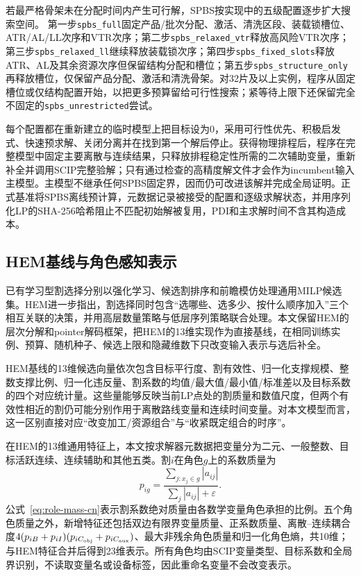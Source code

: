 \documentclass[final,5p,times,twocolumn]{elsarticle}
\begin{document}
若最严格骨架未在分配时间内产生可行解，SPBS按实现中的五级配置逐步扩大搜索空间。
第一步\texttt{spbs\_full}固定产品/批次分配、激活、清洗区段、装载锁槽位、ATR/AL/LL次序和VTR次序；第二步\texttt{spbs\_relaxed\_vtr}释放高风险VTR次序；第三步\texttt{spbs\_relaxed\_ll}继续释放装载锁次序；第四步\texttt{spbs\_fixed\_slots}释放ATR、AL及其余资源次序但保留结构分配和槽位；第五步\texttt{spbs\_structure\_only}再释放槽位，仅保留产品分配、激活和清洗骨架。对32片及以上实例，程序从固定槽位或仅结构配置开始，以把更多预算留给可行性搜索；紧等待上限下还保留完全不固定的\texttt{spbs\_unrestricted}尝试。

每个配置都在重新建立的临时模型上把目标设为0，采用可行性优先、积极启发式、快速预求解、关闭分离并在找到第一个解后停止。获得物理排程后，程序在完整模型中固定主要离散与连续结果，只释放排程稳定性所需的二次辅助变量，重新补全并调用SCIP完整验解；只有通过检查的高精度解文件才会作为incumbent输入主模型。主模型不继承任何SPBS固定界，因而仍可改进该解并完成全局证明。正式基准将SPBS离线预计算，元数据记录被接受的配置和逐级求解状态，并用序列化LP的SHA-256哈希阻止不匹配初始解被复用，PDI和主求解时间不含其构造成本。

\subsection{HEM基线与角色感知表示}

已有学习型割选择分别以强化学习、候选割排序和前瞻模仿处理通用MILP候选集\citep{tang2020cut,huang2022cutranking,paulus2022looking}。HEM进一步指出，割选择同时包含“选哪些、选多少、按什么顺序加入”三个相互关联的决策，并用高层数量策略与低层序列策略联合处理\citep{wang2023hem}。本文保留HEM的层次分解和pointer解码框架，把HEM的13维实现作为直接基线，在相同训练实例、预算、随机种子、候选上限和隐藏维数下只改变输入表示与选后补全。

HEM基线的13维候选向量依次包含目标平行度、割有效性、归一化支撑规模、整数支撑比例、归一化违反量、割系数的均值/最大值/最小值/标准差以及目标系数的四个对应统计量。这些量能够反映当前LP点处的割质量和数值尺度，但两个有效性相近的割仍可能分别作用于离散路线变量和连续时间变量。对本文模型而言，这一区别直接对应“改变加工/资源组合”与“收紧既定组合的时序”。

在HEM的13维通用特征上，本文按求解器元数据把变量分为二元、一般整数、目标活跃连续、连续辅助和其他五类。割$i$在角色$g$上的系数质量为
\begin{equation}
p_{ig}=\frac{\sum_{j:x_j\in g}|a_{ij}|}{\sum_j|a_{ij}|+\varepsilon}.
\label{eq:role-mass-cn}
\end{equation}
公式~\eqref{eq:role-mass-cn}表示割系数绝对质量由各数学变量角色承担的比例。五个角色质量之外，新增特征还包括双边有限界变量质量、正系数质量、离散--连续耦合度$4(p_{iB}+p_{iI})(p_{iC_{\rm obj}}+p_{iC_{\rm aux}})$、最大非残余角色质量和归一化角色熵，共10维；与HEM特征合并后得到23维表示。所有角色均由SCIP变量类型、目标系数和全局界识别，不读取变量名或设备标签，因此重命名变量不会改变表示。
\end{document}
